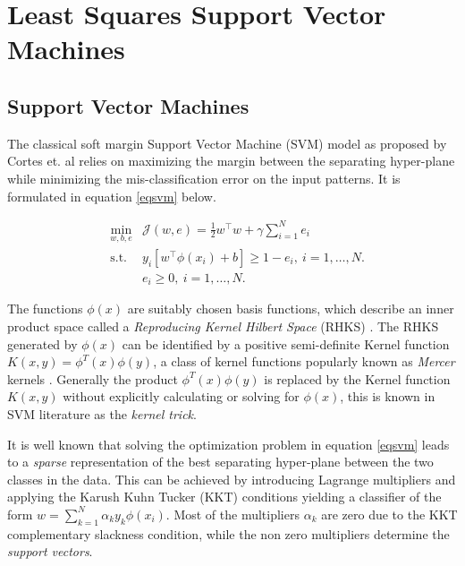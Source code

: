 \chapter{Least Squares Support Vector Machines}
\label{cha:1}
\section{Support Vector Machines} \label{SVM}
 
The classical soft margin Support Vector Machine (SVM) model as proposed by Cortes et. al \cite{Cortes} relies on maximizing the margin between the separating hyper-plane while minimizing the mis-classification error on the input patterns. It is formulated in equation \eqref{eqsvm} below.

\begin{equation}\label{eqsvm}
\begin{aligned}
& \underset{w,b,e}{\text{min}} &
 \mathcal{J}(w,e) = \frac{1}{2}w^{\intercal}w + \gamma\sum\limits_{i=1}^N e_{i} \\
& \text{s.t.} &
y_{i}[ w^{\intercal}\phi(x_{i})+b ] \geq 1 - e_{i},\ i=1,\ldots ,N. \\
& & e_{i} \geq 0,\ i=1,\ldots ,N.
\end{aligned}
\end{equation}

The functions $\phi(x)$ are suitably chosen basis functions, which describe an inner product space called a \textit{Reproducing Kernel Hilbert Space} (RHKS) \cite{N.Aronszjan1950}. The RHKS generated by $\phi(x)$ can be identified by a positive semi-definite Kernel function $K(x, y) = \phi^{T}(x)\phi(y)$, a class of kernel functions popularly known as \textit{Mercer} kernels \cite{Mercer}. Generally the product $\phi^{T}(x)\phi(y)$ is replaced by the Kernel function $K(x, y)$ without explicitly calculating or solving for $\phi(x)$, this is known in SVM literature as the \textit{kernel trick}.

It is well known that solving the optimization problem in equation \eqref{eqsvm} leads to a \textit{sparse} representation of the best separating hyper-plane between the two classes in the data. This can be achieved by introducing Lagrange multipliers and applying the Karush Kuhn Tucker (KKT) conditions yielding a classifier of the form $w = \sum\limits_{k=1}^N \alpha_k y_k \phi(x_{i})$. Most of the multipliers $\alpha_k$ are zero due to the KKT complementary slackness condition, while the non zero multipliers determine the \textit{support vectors}.

